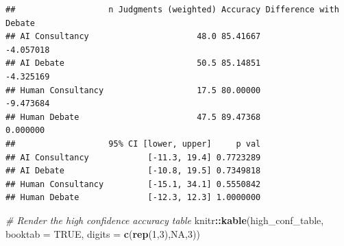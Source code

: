 \documentclass[
]{article}
\newenvironment{Shaded}{\begin{snugshade}}{\end{snugshade}}
\newcommand{\AttributeTok}[1]{\textcolor[rgb]{0.13,0.29,0.53}{#1}}
\newcommand{\CommentTok}[1]{\textcolor[rgb]{0.56,0.35,0.01}{\textit{#1}}}
\newcommand{\ConstantTok}[1]{\textcolor[rgb]{0.56,0.35,0.01}{#1}}
\newcommand{\DecValTok}[1]{\textcolor[rgb]{0.00,0.00,0.81}{#1}}
\newcommand{\FunctionTok}[1]{\textcolor[rgb]{0.13,0.29,0.53}{\textbf{#1}}}
\newcommand{\NormalTok}[1]{#1}
\newcommand{\SpecialCharTok}[1]{\textcolor[rgb]{0.81,0.36,0.00}{\textbf{#1}}}
\begin{document}
\begin{verbatim}
##                   n Judgments (weighted) Accuracy Difference with Debate
## AI Consultancy                      48.0 85.41667              -4.057018
## AI Debate                           50.5 85.14851              -4.325169
## Human Consultancy                   17.5 80.00000              -9.473684
## Human Debate                        47.5 89.47368               0.000000
##                   95% CI [lower, upper]     p val
## AI Consultancy            [-11.3, 19.4] 0.7723289
## AI Debate                 [-10.8, 19.5] 0.7349818
## Human Consultancy         [-15.1, 34.1] 0.5550842
## Human Debate              [-12.3, 12.3] 1.0000000
\end{verbatim}

\begin{Shaded}
\begin{Highlighting}[]
\CommentTok{\# Render the high confidence accuracy table}
\NormalTok{knitr}\SpecialCharTok{::}\FunctionTok{kable}\NormalTok{(high\_conf\_table, }\AttributeTok{booktab =} \ConstantTok{TRUE}\NormalTok{, }\AttributeTok{digits =} \FunctionTok{c}\NormalTok{(}\FunctionTok{rep}\NormalTok{(}\DecValTok{1}\NormalTok{,}\DecValTok{3}\NormalTok{),}\ConstantTok{NA}\NormalTok{,}\DecValTok{3}\NormalTok{))}
\end{Highlighting}
\end{Shaded}
\end{document}
